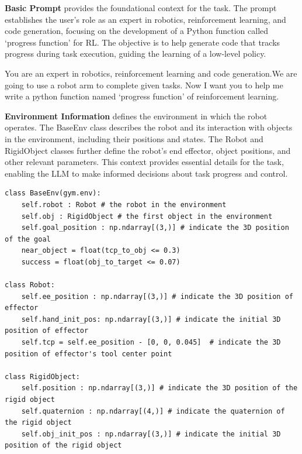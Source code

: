 
\textbf{Basic Prompt}
provides the foundational context for the task. The prompt establishes the user's role as an expert in robotics, reinforcement learning, and code generation, focusing on the development of a Python function called `progress function' for RL. The objective is to help generate code that tracks progress during task execution, guiding the learning of a low-level policy.
\begin{tcolorbox}[colframe=kuangyellow, colback=backgroundyellow, coltitle=black, title={Basic Propmt}, breakable]
You are an expert in robotics, reinforcement learning and code generation.We are going to use a robot arm to complete given tasks. Now I want you to help me write a python function named `progress function' of reinforcement learning.
\end{tcolorbox}

\textbf{Environment Information}
defines the environment in which the robot operates. The BaseEnv class describes the robot and its interaction with objects in the environment, including their positions and states. The Robot and RigidObject classes further define the robot's end effector, object positions, and other relevant parameters. This context provides essential details for the task, enabling the LLM to make informed decisions about task progress and control.
\begin{tcolorbox}[colframe=kuangyellow, colback=backgroundyellow, coltitle=black, title={Environment Information}, breakable]
\begin{lstlisting}
class BaseEnv(gym.env):
    self.robot : Robot # the robot in the environment
    self.obj : RigidObject # the first object in the environment
    self.goal_position : np.ndarray[(3,)] # indicate the 3D position of the goal
    near_object = float(tcp_to_obj <= 0.3)
    success = float(obj_to_target <= 0.07)

class Robot:
    self.ee_position : np.ndarray[(3,)] # indicate the 3D position of effector
    self.hand_init_pos: np.ndarray[(3,)] # indicate the initial 3D position of effector
    self.tcp = self.ee_position - [0, 0, 0.045]  # indicate the 3D position of effector's tool center point

class RigidObject:
    self.position : np.ndarray[(3,)] # indicate the 3D position of the rigid object
    self.quaternion : np.ndarray[(4,)] # indicate the quaternion of the rigid object
    self.obj_init_pos : np.ndarray[(3,)] # indicate the initial 3D position of the rigid object
\end{lstlisting}
\end{tcolorbox}

